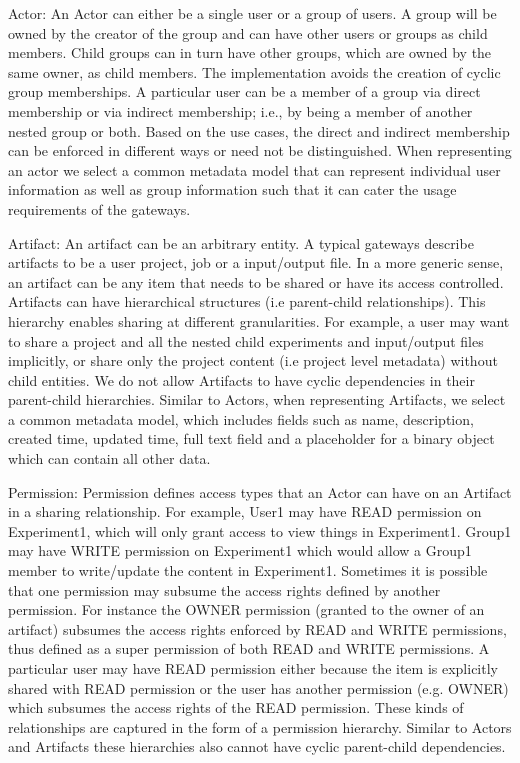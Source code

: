 \documentclass[sigconf]{acmart}
\begin{document}
Actor: An Actor can either be a single user or a group of users. A group will be owned by the creator of the group and can have other users or groups as child members. Child groups can in turn have other groups, which are owned by the same owner, as child members. The implementation avoids the creation of cyclic group memberships. A particular user can be a member of a group via direct membership or via indirect membership; i.e., by being a member of another nested group or both. Based on the use cases, the direct and indirect membership can be enforced in different ways or need not be distinguished. When representing an actor we select a common metadata model that can represent individual user information as well as group information such that it can cater the usage requirements of the gateways.

Artifact: An artifact can be an arbitrary entity. A typical gateways describe artifacts to be a user project, job or a input/output file. In a more generic sense, an artifact can be any item that needs to be shared or have its access controlled. Artifacts can have hierarchical structures (i.e parent-child relationships). This hierarchy enables sharing at different granularities. For example, a user may want to share a project and all the nested child experiments and input/output files implicitly, or share only the project content (i.e project level metadata) without child entities. We do not allow Artifacts to have cyclic dependencies in their parent-child hierarchies. Similar to Actors, when representing Artifacts, we select a common metadata model, which includes fields such as name, description, created time, updated time, full text field and a placeholder for a binary object which can contain all other data.

Permission: Permission defines access types that an Actor can have on an Artifact in a sharing relationship. For example, User1 may have READ permission on Experiment1, which will only grant access to view things in Experiment1. Group1 may have WRITE permission on Experiment1 which would allow a Group1 member to write/update the content in Experiment1. Sometimes it is possible that one permission may subsume the access rights defined by another permission. For instance the OWNER permission (granted to the owner of an artifact) subsumes the access rights enforced by READ and WRITE permissions, thus defined as a super permission of both READ and WRITE permissions. A particular user may have READ permission either because the item is explicitly shared with READ permission or the user has another permission (e.g. OWNER) which subsumes the access rights of the READ permission. These kinds of relationships are captured in the form of a permission hierarchy. Similar to Actors and Artifacts these hierarchies also cannot have cyclic parent-child dependencies.
\end{document}
